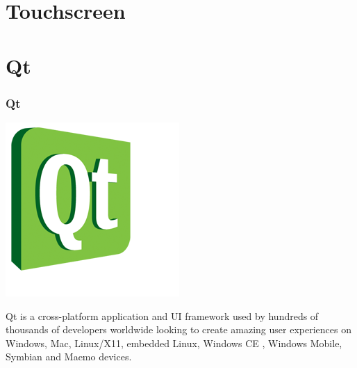 \documentclass{beamer}
\begin{document}
	\section{Touchscreen}
	
	\section{Qt}
	
	\begin{frame}
		\frametitle{Qt}
		\begin{floatingfigure}[l]{1.75cm}
			\includegraphics[scale=0.3]{img/qt-logo}
		\end{floatingfigure}
		
		Qt is a cross-platform application  and UI framework used by hundreds of thousands of developers worldwide looking to create amazing user experiences  on Windows, Mac, Linux/X11, embedded Linux, Windows CE , Windows Mobile, Symbian  and Maemo devices.
	\end{frame}	
	
\end{document}

